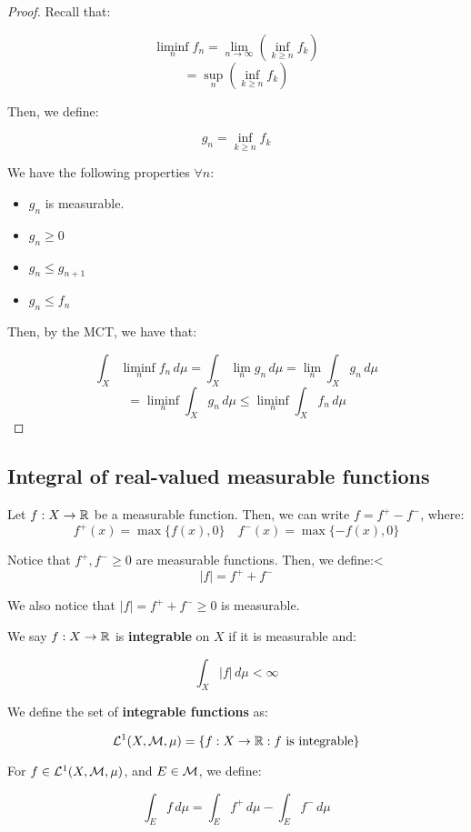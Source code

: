 \begin{proof}
    Recall that:

    $$\liminf_{n} f_n = \lim_{n \to \infty} \left(\inf_{k \geq n} f_k\right)$$
    $$= \sup_{n} \left(\inf_{k \geq n} f_k\right)$$

    Then, we define:

    $$g_n = \inf_{k \geq n} f_k$$

    We have the following properties $\forall n$:

    \begin{itemize}
        \item $g_n$ is measurable.
        
        \item $g_n \geq 0$
        
        \item $g_n \leq g_{n+1}$ 
        
        \item $g_n \leq f_n$
    \end{itemize}

    Then, by the MCT, we have that:

    $$\int_{X} \liminf_{n} f_n \, d\mu = \int_{X} \lim_{n} g_n \, d\mu = \lim_{n} \int_{X} g_n \, d\mu$$
    $$= \liminf_{n} \int_{X} g_n \, d\mu \leq \liminf_{n} \int_{X} f_n \, d\mu$$
\end{proof}

\subsection{Integral of real-valued measurable functions}

Let $f: X \to \mathbb{R}$ be a measurable function. Then, we can write $f = f^+ - f^-$, where:
$$f^+(x) = \max\{f(x), 0\} \quad f^-(x) = \max\{-f(x), 0\}$$

Notice that $f^+, f^- \geq 0$ are measurable functions. Then, we define:<
$$|f| = f^+ + f^-$$

We also notice that $|f| = f^+ + f^- \geq 0$ is measurable. 

\begin{fdefinition}
    We say $f: X \to \mathbb{R}$ is \textbf{integrable} on $X$ if it is measurable and:
    
    $$\int_{X} |f| \, d\mu < \infty$$

    We define the set of \textbf{integrable functions} as:

    $$\mathcal{L}^1(X, \mathcal{M}, \mu) = \{f: X \to \mathbb{R}: f \text{ is integrable}\}$$

    For $f \in \mathcal{L}^1(X, \mathcal{M}, \mu)$, and $E \in \mathcal{M}$, we define:

    $$\int_{E} f \, d\mu = \int_{E} f^+ \, d\mu - \int_{E} f^- \, d\mu$$

\end{fdefinition}

